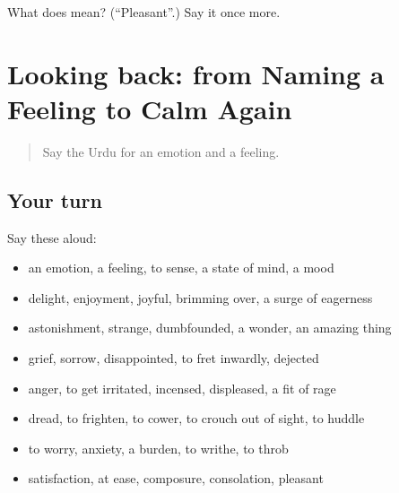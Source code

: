 \begin{tcolorbox}[breakable,colback=teal!4,colframe=teal!35!black,title={Before you move on}]
What does  mean? (\textquotedblleft{}Pleasant\textquotedblright{}.) Say it once more.
\end{tcolorbox}
\section[(dialogue)]{Looking back: from Naming a Feeling to Calm Again}

\label{lesson:UR-R447-review-440-447}



\begin{quote}
Say the Urdu for an emotion and a feeling.
\end{quote}

\subsection*{Your turn}
Say these aloud:

\begin{itemize}
\raggedright
  \item an emotion, a feeling, to sense, a state of mind, a mood
  \item delight, enjoyment, joyful, brimming over, a surge of eagerness
  \item astonishment, strange, dumbfounded, a wonder, an amazing thing
  \item grief, sorrow, disappointed, to fret inwardly, dejected
  \item anger, to get irritated, incensed, displeased, a fit of rage
  \item dread, to frighten, to cower, to crouch out of sight, to huddle
  \item to worry, anxiety, a burden, to writhe, to throb
  \item satisfaction, at ease, composure, consolation, pleasant
\end{itemize}

